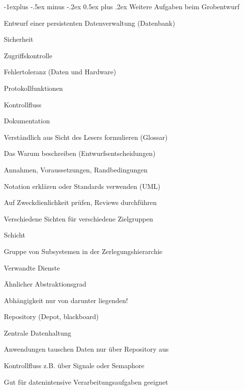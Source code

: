\documentclass[a4paper]{article}
\makeatletter
\renewcommand{\subsection}{\@startsection{subsection}{2}{0mm}%
                                {-1explus -.5ex minus -.2ex}%
                                {0.5ex plus .2ex}%
                                {\normalfont\normalsize\bfseries}}
\makeatother
\begin{document}
\begin{multicols}{3}
  \subsection{Weitere Aufgaben beim Grobentwurf}
  \begin{itemize*}
    \item Entwurf einer persistenten Datenverwaltung (Datenbank)
    \item Sicherheit
    \begin{itemize*}
      \item Zugriffskontrolle
      \item Fehlertoleranz (Daten und Hardware)
      \item Protokollfunktionen
    \end{itemize*}
    \item Kontrollfluss
    \item Dokumentation
    \begin{itemize*}
      \item Verständlich aus Sicht des Lesers formulieren (Glossar)
      \item Das Warum beschreiben (Entwurfsentscheidungen)
      \item Annahmen, Voraussetzungen, Randbedingungen
      \item Notation erklären oder Standards verwenden (UML)
      \item Auf Zweckdienlichkeit prüfen, Reviews durchführen
      \item Verschiedene Sichten für verschiedene Zielgruppen
    \end{itemize*}
  \end{itemize*}

  Schicht
  \begin{itemize*}
    \item Gruppe von Subsystemen in der Zerlegungshierarchie
    \item Verwandte Dienste
    \item Ähnlicher Abstraktionsgrad
    \item Abhängigkeit nur von darunter liegenden!
  \end{itemize*}

  Repository (Depot, blackboard)
  \begin{itemize*}
    \item Zentrale Datenhaltung
    \item Anwendungen tauschen Daten nur über Repository aus
    \item Kontrollfluss z.B. über Signale oder Semaphore
    \item Gut für datenintensive Verarbeitungsaufgaben geeignet
  \end{itemize*}


\end{multicols}
\end{document}
